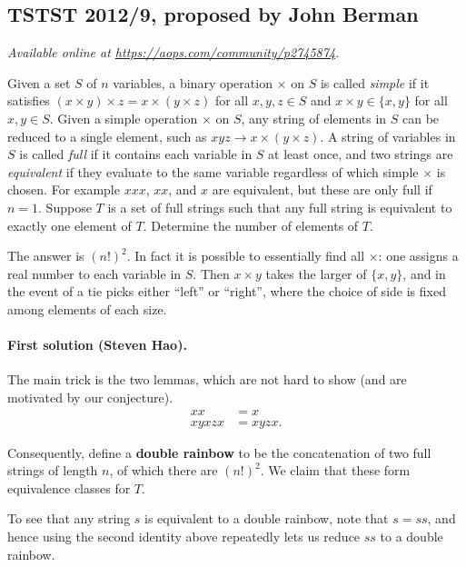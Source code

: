 \documentclass[11pt]{scrartcl}
\begin{document}
\subsection{TSTST 2012/9, proposed by John Berman}
\textsl{Available online at \url{https://aops.com/community/p2745874}.}
\begin{mdframed}[style=mdpurplebox,frametitle={Problem statement}]
Given a set $S$ of $n$ variables,
a binary operation $\times$ on $S$ is called \textit{simple}
if it satisfies $(x \times y) \times z = x \times (y \times z)$
for all $x,y,z \in S$ and
$x \times y \in \{x,y\}$ for all $x,y \in S$.
Given a simple operation $\times$ on $S$,
any string of elements in $S$ can be reduced to a single element,
such as $xyz \to x \times (y \times z)$.
A string of variables in $S$ is called \textit{full}
if it contains each variable in $S$ at least once,
and two strings are \textit{equivalent} if they evaluate to the
same variable regardless of which simple $\times$ is chosen.
For example $xxx$, $xx$, and $x$ are equivalent,
but these are only full if $n=1$.
Suppose $T$ is a set of full strings such that any full string is
equivalent to exactly one element of $T$.
Determine the number of elements of $T$.
\end{mdframed}
The answer is $(n!)^2$.
In fact it is possible to essentially find all $\times$:
one assigns a real number to each variable in $S$.
Then $x \times y$ takes the larger of $\{x,y\}$,
and in the event of a tie picks either ``left'' or ``right'',
where the choice of side is fixed among elements of each size.

\paragraph{First solution (Steven Hao).}
The main trick is the two lemmas, which are not hard to show
(and are motivated by our conjecture).
\begin{align*}
  xx &= x \\
  xyxzx &= xyzx.
\end{align*}

Consequently, define a \textbf{double rainbow}
to be the concatenation of two full strings of length $n$,
of which there are $(n!)^2$.
We claim that these form equivalence classes for $T$.

To see that any string $s$ is equivalent to a double rainbow,
note that $s = ss$, and hence using the second identity above
repeatedly lets us reduce $ss$ to a double rainbow.
\end{document}

